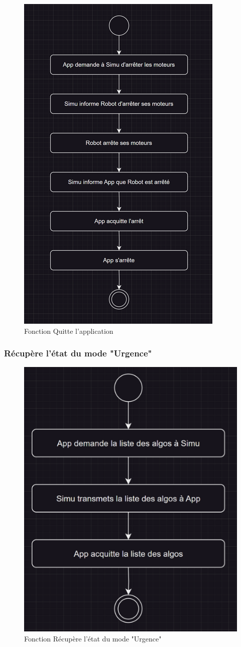 \begin{figure}[H]
    \centering
    \includegraphics[scale=0.5]{data/function3.png}
    \caption{Fonction Quitte l'application}
    \label{fig:ihm_quit}
\end{figure}

\subsubsection{Récupère l'état du mode "Urgence"}

\begin{figure}[H]
    \centering
    \includegraphics[scale=0.5]{data/function4.png}
    \caption{Fonction Récupère l'état du mode "Urgence"}
    \label{fig:ihm_get_emergency}
\end{figure}